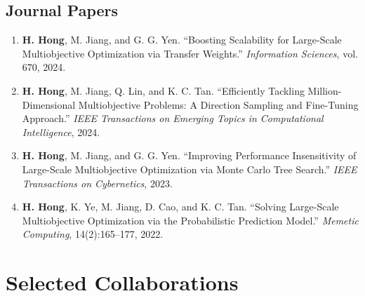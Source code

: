 \documentclass[11pt,a4paper]{article}
\begin{document}
\subsection*{Journal Papers}

\begin{enumerate}[leftmargin=1.5em,start=7]

\item \textbf{H. Hong}, M. Jiang, and G. G. Yen.
\newblock ``Boosting Scalability for Large-Scale Multiobjective Optimization via Transfer Weights.''
\newblock \textit{Information Sciences}, vol. 670, 2024.

\item \textbf{H. Hong}, M. Jiang, Q. Lin, and K. C. Tan.
\newblock ``Efficiently Tackling Million-Dimensional Multiobjective Problems: A Direction Sampling and Fine-Tuning Approach.''
\newblock \textit{IEEE Transactions on Emerging Topics in Computational Intelligence}, 2024.

\item \textbf{H. Hong}, M. Jiang, and G. G. Yen.
\newblock ``Improving Performance Insensitivity of Large-Scale Multiobjective Optimization via Monte Carlo Tree Search.''
\newblock \textit{IEEE Transactions on Cybernetics}, 2023.

\item \textbf{H. Hong}, K. Ye, M. Jiang, D. Cao, and K. C. Tan.
\newblock ``Solving Large-Scale Multiobjective Optimization via the Probabilistic Prediction Model.''
\newblock \textit{Memetic Computing}, 14(2):165--177, 2022.

\end{enumerate}

\section*{Selected Collaborations}
\end{document}

